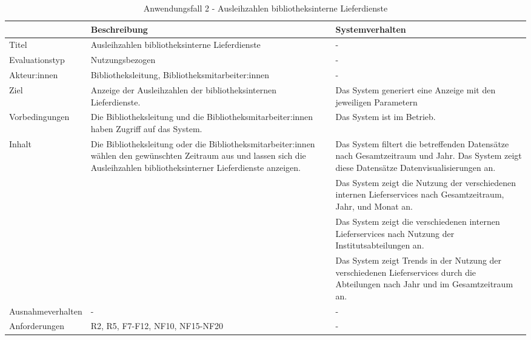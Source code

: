 \begingroup
\setlength{\tabcolsep}{10pt} %
\renewcommand{\arraystretch}{1.25} 
\begin{table}[h]
    \centering
    \begin{adjustbox}{max width=\textwidth}
    \begin{tabular}{lp{7.0cm}p{7.0cm}}
       \toprule
       \textbf{}          & \textbf{Beschreibung} &\textbf{Systemverhalten}\\
       \midrule
        Titel                            &Ausleihzahlen bibliotheksinterne Lieferdienste& -\\
        Evaluationstyp                   &Nutzungsbezogen                   & -\\
        Akteur:innen                     &Bibliotheksleitung, Bibliotheksmitarbeiter:innen& -\\
        Ziel                             &Anzeige der Ausleihzahlen der bibliotheksinternen Lieferdienste.& Das System generiert eine Anzeige mit den jeweiligen Parametern\\
        Vorbedingungen                   &Die Bibliotheksleitung und die Bibliotheksmitarbeiter:innen haben Zugriff auf das System.& Das System ist im Betrieb.\\
        Inhalt                          &Die Bibliotheksleitung oder die Bibliotheksmitarbeiter:innen wählen den gewünschten Zeitraum aus und lassen sich die Ausleihzahlen bibliotheksinterner Lieferdienste anzeigen. & Das System filtert die betreffenden Datensätze nach Gesamtzeitraum und Jahr. Das System zeigt diese Datensätze Datenvisualisierungen an.\\
                                        & &Das System zeigt die Nutzung der verschiedenen internen Lieferservices nach Gesamtzeitraum, Jahr, und Monat an.\\
                                        & &Das System zeigt die verschiedenen internen Lieferservices nach Nutzung der Institutsabteilungen an.\\
                                        & &Das System zeigt Trends in der Nutzung der verschiedenen Lieferservices  durch die Abteilungen nach Jahr und im Gesamtzeitraum an.\\
        Ausnahmeverhalten               &- & -\\
        Anforderungen                   &R2, R5, F7-F12, NF10, NF15-NF20& -\\
        \bottomrule
    \end{tabular}
    \end{adjustbox}
    \caption{%
    Anwendungsfall 2 - Ausleihzahlen bibliotheksinterne Lieferdienste
    }
    \label{tab:AF_Lieferdienste}
    \end{table}
\endgroup

